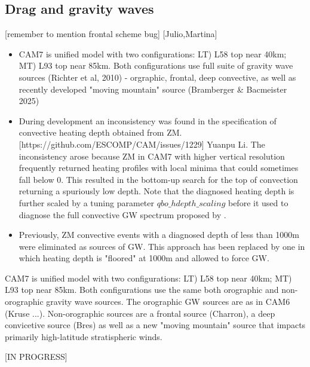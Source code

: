 \documentclass[draft]{agujournal2019}
\begin{document}
 \subsection{Drag and gravity waves}
 [remember to mention frontal scheme bug]
[Julio,Martina]
\begin{itemize}
    \item CAM7 is unified model with two configurations: LT) L58 top near 40km; MT) L93 top near 85km. Both configurations use full suite of gravity wave sources (Richter et al, 2010) - orgraphic, frontal, deep convective, as well as recently developed "moving mountain" source (Bramberger \& Bacmeister 2025)
    \item During development an inconsistency was found in the specification of convective heating depth obtained from ZM. [https://github.com/ESCOMP/CAM/issues/1229] Yuanpu Li. The inconsistency arose because ZM in CAM7 with higher vertical resolution frequently returned heating profiles with local minima that could sometimes fall below 0. This resulted in the bottom-up search for the top of convection returning a spuriously low depth. Note that the diagnosed heating depth is further scaled by a tuning parameter $qbo\_hdepth\_scaling$ before it used to diagnose the full convective GW spectrum proposed by \cite{Beres_etal_2004}.
    \item Previously, ZM convective events with a diagnosed depth of less than 1000m were eliminated as sources of GW. This approach has been replaced by one in which heating depth is "floored" at 1000m and allowed to force GW. 
\end{itemize}

CAM7 is unified model with two configurations: LT) L58 top near 40km; MT) L93 top near 85km. Both configurations use the same both orographic and non-orographic gravity wave sources.  The orographic GW sources are as in CAM6 (Kruse ...).  Non-orographic sources are a frontal source (Charron), a deep convicetive source (Bres) as well as a new "moving mountain" source that impacts primarily high-latitude stratispheric winds.


[IN PROGRESS]
\end{document}
